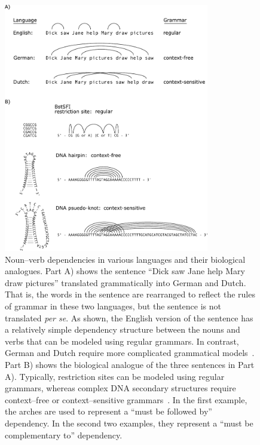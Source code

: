             \begin{figure}[ptb]
            \centering
            \includegraphics[width=0.80\textwidth]{Body/Images-chap1/dependencies.pdf}
            \caption[Noun--verb dependencies in various languages and their
            biological analogues]{Noun--verb dependencies in various languages and their
            biological analogues.  Part A) shows the sentence
            ``Dick saw Jane help Mary draw pictures'' translated
            grammatically into German and Dutch.  That is, the words
            in the sentence are rearranged to reflect the rules of
            grammar in these two languages, but the sentence is not
            translated \emph{per se}.  As shown, the English
            version of the sentence has a relatively simple
            dependency structure between the nouns and verbs that
            can be modeled using regular grammars.  In contrast,
            German and Dutch require more complicated grammatical
            models~\cite{shieber1985evidence,bresnan1982cross,jurafsky2000speech}.
            Part B) shows the biological analogue of the three
            sentences in Part A).  Typically, restriction sites can
            be modeled using regular grammars, whereas complex DNA
            secondary structures require context--free or
            context--sensitive grammars~\cite{rivas2000language}.  In the first example, the
            arches are used to represent a ``must be followed by''
            dependency.  In the second two examples, they represent
            a ``must be complementary to'' dependency.
            }
            \label{fig:dependencies}
            \end{figure}

